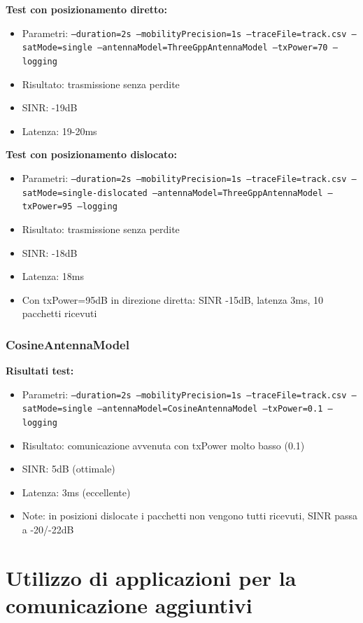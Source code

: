 \documentclass[12pt,a4paper]{article}
\begin{document}
\textbf{Test con posizionamento diretto:}
\begin{itemize}
    \item Parametri: \texttt{--duration=2s --mobilityPrecision=1s --traceFile=track.csv --satMode=single --antennaModel=ThreeGppAntennaModel --txPower=70 --logging}
    \item Risultato: trasmissione senza perdite
    \item SINR: -19dB
    \item Latenza: 19-20ms
\end{itemize}

\textbf{Test con posizionamento dislocato:}
\begin{itemize}
    \item Parametri: \texttt{--duration=2s --mobilityPrecision=1s --traceFile=track.csv --satMode=single-dislocated --antennaModel=ThreeGppAntennaModel --txPower=95 --logging}
    \item Risultato: trasmissione senza perdite
    \item SINR: -18dB
    \item Latenza: 18ms
    \item Con txPower=95dB in direzione diretta: SINR -15dB, latenza 3ms, 10 pacchetti ricevuti
\end{itemize}

\subsubsection{CosineAntennaModel}

\textbf{Risultati test:}
\begin{itemize}
    \item Parametri: \texttt{--duration=2s --mobilityPrecision=1s --traceFile=track.csv --satMode=single --antennaModel=CosineAntennaModel --txPower=0.1 --logging}
    \item Risultato: comunicazione avvenuta con txPower molto basso (0.1)
    \item SINR: 5dB (ottimale)
    \item Latenza: 3ms (eccellente)
    \item Note: in posizioni dislocate i pacchetti non vengono tutti ricevuti, SINR passa a -20/-22dB
\end{itemize}

\section{Utilizzo di applicazioni per la comunicazione aggiuntivi}
\end{document}
